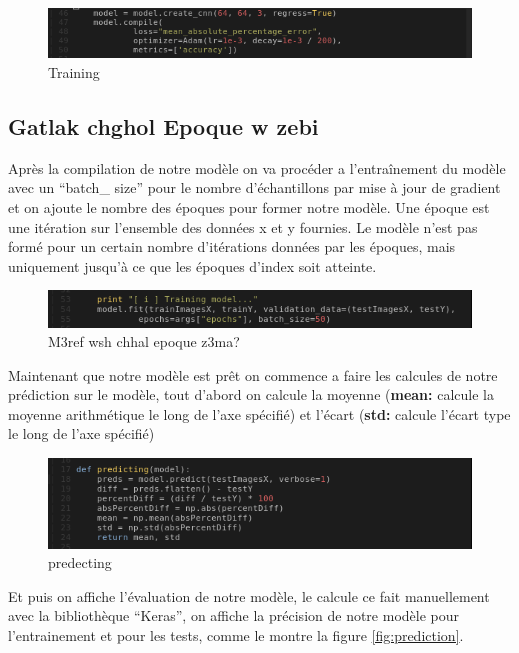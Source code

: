 \documentclass[12pt]{article}
\begin{document}
\begin{figure}[h]
	\centering
	\includegraphics[width=15cm]{img-Chapiter-4/training.png}
	\caption{Training}
\end{figure}

\subsection*{Gatlak chghol Epoque w zebi}
Après la compilation de notre modèle on va procéder a l’entraînement du modèle avec un “batch\_ size” pour le nombre d'échantillons par mise à jour de gradient et on ajoute le nombre des époques pour former notre modèle. Une époque est une itération sur l'ensemble des données x et y fournies. Le modèle n'est pas formé pour un certain nombre d'itérations données par les époques, mais uniquement jusqu'à ce que les époques d'index soit atteinte.

\begin{figure}[h]
	\centering
	\includegraphics[width=15cm]{img-Chapiter-4/train.png}
	\caption{M3ref wsh chhal epoque z3ma?}
\end{figure}

Maintenant que notre modèle est prêt on commence a faire les calcules de notre prédiction sur le modèle, tout d'abord on calcule la moyenne (\textbf{mean:} calcule la moyenne arithmétique le long de l'axe spécifié) et l’écart (\textbf{std:} calcule l'écart type le long de l'axe spécifié)

\begin{figure}[h]
	\centering
	\includegraphics[width=15cm]{img-Chapiter-4/predecting.png}
	\caption{predecting}
\end{figure}

Et puis on affiche l’évaluation de notre modèle, le calcule ce fait manuellement avec la bibliothèque “Keras”, on affiche la précision de notre modèle pour l’entrainement et pour les tests, comme le montre la figure \ref{fig:prediction}.
\end{document}
